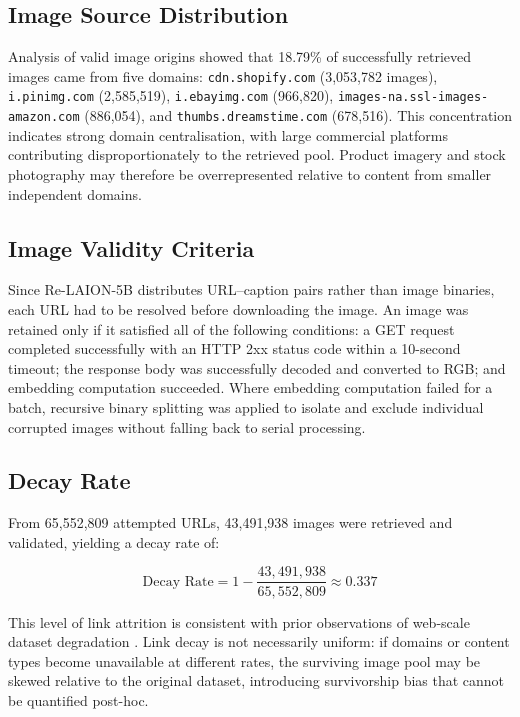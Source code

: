 \subsection{Image Source Distribution}
\label{subsec:image_source}

Analysis of valid image origins showed that 18.79\% of successfully retrieved images came from five domains: \texttt{cdn.shopify.com} (3,053,782 images), \texttt{i.pinimg.com} (2,585,519), \texttt{i.ebayimg.com} (966,820), \texttt{images-na.ssl-images-amazon.com} (886,054), and \texttt{thumbs.dreamstime.com} (678,516). This concentration indicates strong domain centralisation, with large commercial platforms contributing disproportionately to the retrieved pool. Product imagery and stock photography may therefore be overrepresented relative to content from smaller independent domains.

\subsection{Image Validity Criteria}
\label{subsec:image_validity}

Since Re-LAION-5B distributes URL--caption pairs rather than image binaries, each URL had to be resolved before downloading the image. An image was retained only if it satisfied all of the following conditions: a GET request completed successfully with an HTTP 2xx status code within a 10-second timeout; the response body was successfully decoded and converted to RGB; and embedding computation succeeded. Where embedding computation failed for a batch, recursive binary splitting was applied to isolate and exclude individual corrupted images without falling back to serial processing.

\subsection{Decay Rate}
\label{subsec:decay_rate}

From 65,552,809 attempted URLs, 43,491,938 images were retrieved and validated, yielding a decay rate of:

\[
	\text{Decay Rate} = 1 - \frac{43{,}491{,}938}{65{,}552{,}809} \approx 0.337
\]

This level of link attrition is consistent with prior observations of web-scale dataset degradation \cite{Klein_2014_LinkRot, Schuhmann_2022_Laion5b}. Link decay is not necessarily uniform: if domains or content types become unavailable at different rates, the surviving image pool may be skewed relative to the original dataset, introducing survivorship bias that cannot be quantified post-hoc.

